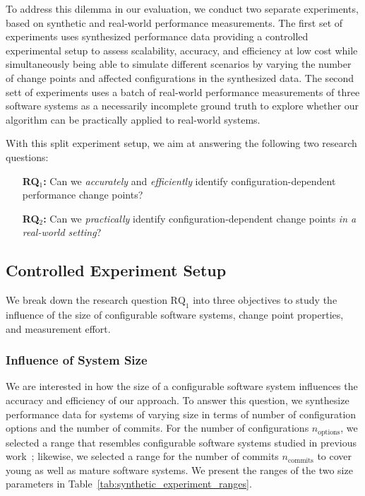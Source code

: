 \documentclass[sigconf, screen]{acmart}
\begin{document}
	To address this dilemma in our evaluation, we conduct two separate experiments, based on synthetic and real-world performance measurements. The first set of experiments uses synthesized performance data providing a controlled experimental setup to assess scalability, accuracy, and efficiency at low cost while simultaneously being able to simulate different scenarios by varying the number of change points and affected configurations in the synthesized data.
	The second sett of experiments uses a batch of real-world performance measurements of three software systems as a necessarily incomplete ground truth to explore whether our algorithm can be practically applied to real-world systems.
	
	With this split experiment setup, we aim at answering the following two research questions:
	\begin{enumerate}[leftmargin=0.825cm]
		\item[\bf RQ$_1$:] Can we \emph{accurately} and \emph{efficiently} identify configuration-de\-pen\-dent performance change points? 
		\item[\bf RQ$_2$:] Can we \emph{practically} identify configuration-de\-pen\-dent change points \emph{in a real-world setting}? 
	\end{enumerate}
	\subsection{Controlled Experiment Setup}
	We break down the research question $\text{RQ}_1$ into three objectives  to study the influence of the size of configurable software systems, change point properties, and measurement effort.
	
	\subsubsection{Influence of System Size}
	We are interested in how the size of a configurable software system influences the accuracy and efficiency of our approach. 
	To answer this question, we synthesize performance data for systems of varying size in terms of number of configuration options and the number of commits. For the number of configurations $n_\text{options}$, we selected a range that resembles configurable software systems studied in previous work~\cite{muhlbauer_accurate_2019}; likewise, we selected a range for the number of commits $n_\text{commits}$ to cover young as well as mature software systems. We present the ranges of the two size parameters in Table~\ref{tab:synthetic_experiment_ranges}.
	
\end{document}
